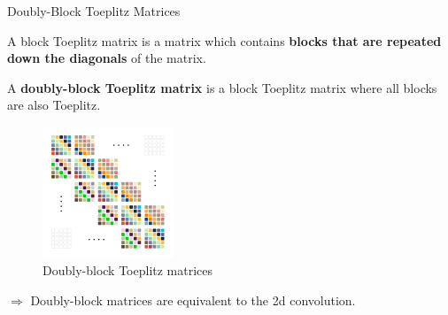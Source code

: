 \begin{frame}{Doubly-Block Toeplitz Matrices}

  A block Toeplitz matrix is a matrix which contains \textbf{blocks that are repeated down the diagonals} of the matrix.

  A \textbf{doubly-block Toeplitz matrix} is a block Toeplitz matrix where all blocks are also Toeplitz.

  \begin{figure}
    \centering
    \includegraphics[width=0.35\textwidth]{images/doubly_block.pdf}
    \caption*{Doubly-block Toeplitz matrices}
  \end{figure}

  $\Rightarrow$ Doubly-block matrices are equivalent to the 2d convolution.
  
\end{frame}








